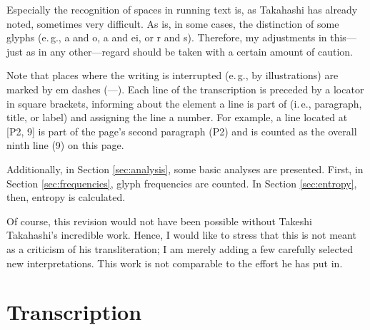 \documentclass{scrarticle}
\begin{document}
Especially the recognition of spaces in running text is, as Takahashi has already noted, sometimes very difficult.
As is, in some cases, the distinction of some glyphs (e.\,g., {\eva a} and {\eva o}, {\eva a} and {\eva ei}, or {\eva r} and {\eva s}).
Therefore, my adjustments in this---just as in any other---regard should be taken with a certain amount of caution.

Note that places where the writing is interrupted (e.\,g., by illustrations) are marked by em dashes (---).
Each line of the transcription is preceded by a locator in square brackets, informing about the element a line is part of (i.\,e., paragraph, title, or label) and assigning the line a number.
For example, a line located at [P2, 9] is part of the page's second paragraph (P2) and is counted as the overall ninth line (9) on this page.

Additionally, in Section \ref{sec:analysis}, some basic analyses are presented.
First, in Section \ref{sec:frequencies}, glyph frequencies are counted.
In Section \ref{sec:entropy}, then, entropy is calculated.

Of course, this revision would not have been possible without Takeshi Takahashi's incredible work.
Hence, I would like to stress that this is not meant as a criticism of his transliteration; I am merely adding a few carefully selected new interpretations.
This work is not comparable to the effort he has put in.


\clearpage
\section{Transcription}\label{sec:transcription}


\end{document}
